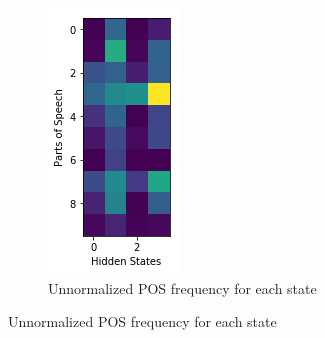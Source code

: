 \begin{figure}[H]
	\begin{subfigure}[t]{0.2\textwidth}
		\includegraphics[width=\textwidth]{4state_unnormalized.png}
		\caption{Unnormalized POS frequency for each state}
	\end{subfigure}%
	
\end{figure}

